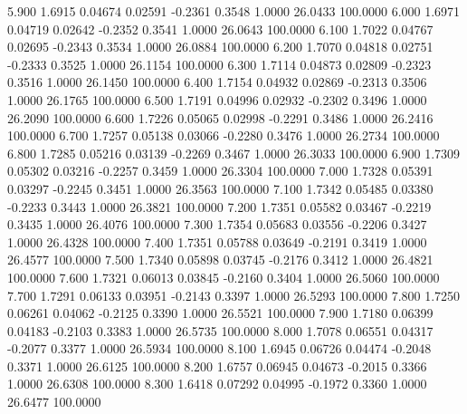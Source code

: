    5.900   1.6915   0.04674   0.02591  -0.2361   0.3548   1.0000  26.0433 100.0000
   6.000   1.6971   0.04719   0.02642  -0.2352   0.3541   1.0000  26.0643 100.0000
   6.100   1.7022   0.04767   0.02695  -0.2343   0.3534   1.0000  26.0884 100.0000
   6.200   1.7070   0.04818   0.02751  -0.2333   0.3525   1.0000  26.1154 100.0000
   6.300   1.7114   0.04873   0.02809  -0.2323   0.3516   1.0000  26.1450 100.0000
   6.400   1.7154   0.04932   0.02869  -0.2313   0.3506   1.0000  26.1765 100.0000
   6.500   1.7191   0.04996   0.02932  -0.2302   0.3496   1.0000  26.2090 100.0000
   6.600   1.7226   0.05065   0.02998  -0.2291   0.3486   1.0000  26.2416 100.0000
   6.700   1.7257   0.05138   0.03066  -0.2280   0.3476   1.0000  26.2734 100.0000
   6.800   1.7285   0.05216   0.03139  -0.2269   0.3467   1.0000  26.3033 100.0000
   6.900   1.7309   0.05302   0.03216  -0.2257   0.3459   1.0000  26.3304 100.0000
   7.000   1.7328   0.05391   0.03297  -0.2245   0.3451   1.0000  26.3563 100.0000
   7.100   1.7342   0.05485   0.03380  -0.2233   0.3443   1.0000  26.3821 100.0000
   7.200   1.7351   0.05582   0.03467  -0.2219   0.3435   1.0000  26.4076 100.0000
   7.300   1.7354   0.05683   0.03556  -0.2206   0.3427   1.0000  26.4328 100.0000
   7.400   1.7351   0.05788   0.03649  -0.2191   0.3419   1.0000  26.4577 100.0000
   7.500   1.7340   0.05898   0.03745  -0.2176   0.3412   1.0000  26.4821 100.0000
   7.600   1.7321   0.06013   0.03845  -0.2160   0.3404   1.0000  26.5060 100.0000
   7.700   1.7291   0.06133   0.03951  -0.2143   0.3397   1.0000  26.5293 100.0000
   7.800   1.7250   0.06261   0.04062  -0.2125   0.3390   1.0000  26.5521 100.0000
   7.900   1.7180   0.06399   0.04183  -0.2103   0.3383   1.0000  26.5735 100.0000
   8.000   1.7078   0.06551   0.04317  -0.2077   0.3377   1.0000  26.5934 100.0000
   8.100   1.6945   0.06726   0.04474  -0.2048   0.3371   1.0000  26.6125 100.0000
   8.200   1.6757   0.06945   0.04673  -0.2015   0.3366   1.0000  26.6308 100.0000
   8.300   1.6418   0.07292   0.04995  -0.1972   0.3360   1.0000  26.6477 100.0000
